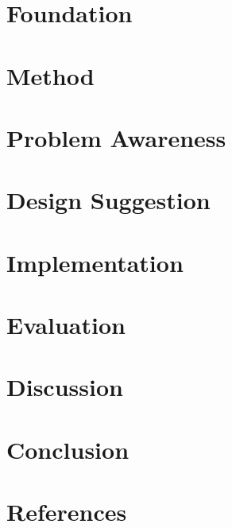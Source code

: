 \documentclass[10pt, a4paper]{article}
\begin{document}
    \clearpage
    \section{Foundation}\label{chap:foundations}
        

    \clearpage
    \section{Method}\label{chap:method}
        

    \clearpage
    \section{Problem Awareness}\label{chap:problem}
        

    \clearpage
    \section{Design Suggestion}\label{chap:design}
        

    \clearpage
    \section{Implementation}\label{chap:implementation}
        

    \clearpage
    \section{Evaluation}\label{chap:evaluation}
        

    \clearpage
    \section{Discussion}\label{chap:discussion}
        

    \clearpage
    \section{Conclusion}\label{chap:conclusion}
        


    \newpage
    \section*{References}
    \printbibliography[heading=none]
\end{document}
